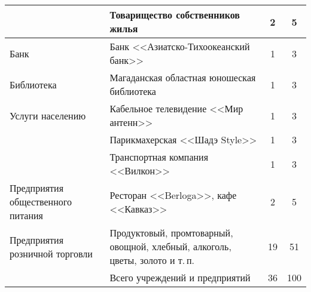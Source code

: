 \begin{table}[h!]
\begin{changemargin}{-2cm}{-1cm}
\begin{tabular}{p{5cm}p{7cm}cc}
                                        & Товарищество 				собственников жилья                                                                                                                      & 2               & 5               \\ \midrule
Банк                                    & Банк 				<<Азиатско-Тихоокеанский банк>>                                                                                                                    & 1               & 3               \\ \midrule
Библиотека                              & Магаданская 				областная юношеская библиотека                                                                                                            & 1               & 3               \\ \midrule
Услуги 				населению                    & Кабельное 				телевидение <<Мир антенн>>                                                                                                                    & 1               & 3               \\
                                        & Парикмахерская 				<<Шадэ Style>>                                                                                                                           & 1               & 3               \\
                                        & Транспортная 				компания <<Вилкон>>                                                                                                                        & 1               & 3               \\ \midrule
Предприятия 				общественного питания   & Ресторан 				<<Berloga>>, кафе <<Кавказ>>                                                                                                                     & 2               & 5               \\ \midrule
Предприятия 				розничной торговли      & Продуктовый, 				промтоварный, овощной, хлебный, 				алкоголь, цветы, золото и т.\,п.                                                                       & 19              & 51              \\  \bottomrule
                                        & Всего учреждений и предприятий                                                                                                                            & 36              & 100\\


                                        \bottomrule
\end{tabular}
\end{changemargin}
\end{table}
